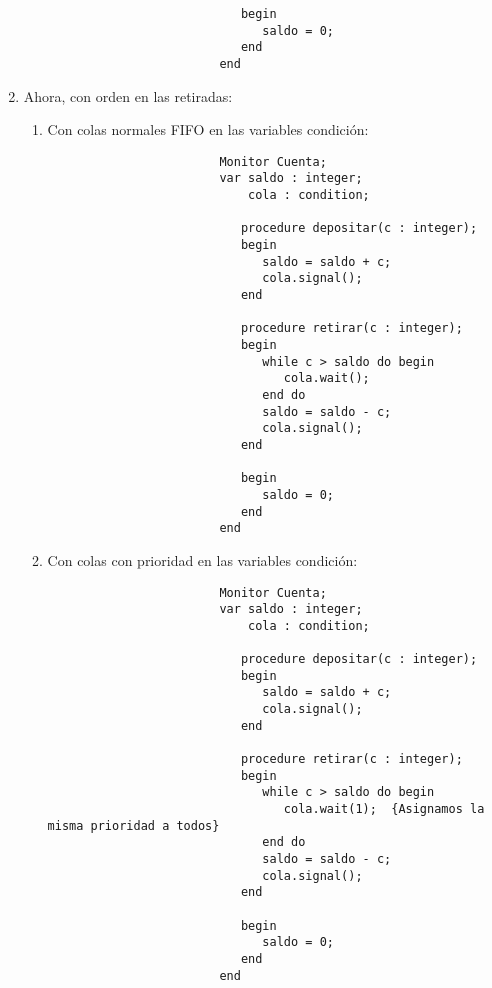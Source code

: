 \begin{ejercicio}
\begin{enumerate}
\begin{enumerate}[label=\alph*)]
\begin{verbatim}
                           begin
                              saldo = 0;
                           end
                        end
                    \end{verbatim}
            \end{enumerate}
        \item Ahora, con orden en las retiradas:
            \begin{enumerate}[label=\alph*)]
                \item Con colas normales FIFO en las variables condición:
                    \begin{verbatim}
                        Monitor Cuenta;
                        var saldo : integer;
                            cola : condition;

                           procedure depositar(c : integer);
                           begin
                              saldo = saldo + c;
                              cola.signal();
                           end

                           procedure retirar(c : integer);
                           begin
                              while c > saldo do begin
                                 cola.wait();
                              end do
                              saldo = saldo - c;
                              cola.signal();
                           end

                           begin
                              saldo = 0;
                           end
                        end
                    \end{verbatim}
                \item Con colas con prioridad en las variables condición:
                    \begin{verbatim}
                        Monitor Cuenta;
                        var saldo : integer;
                            cola : condition;

                           procedure depositar(c : integer);
                           begin
                              saldo = saldo + c;
                              cola.signal();
                           end

                           procedure retirar(c : integer);
                           begin
                              while c > saldo do begin
                                 cola.wait(1);  {Asignamos la misma prioridad a todos}
                              end do
                              saldo = saldo - c;
                              cola.signal();
                           end

                           begin
                              saldo = 0;
                           end
                        end
                    \end{verbatim}
            \end{enumerate}
    \end{enumerate}
\end{ejercicio}

